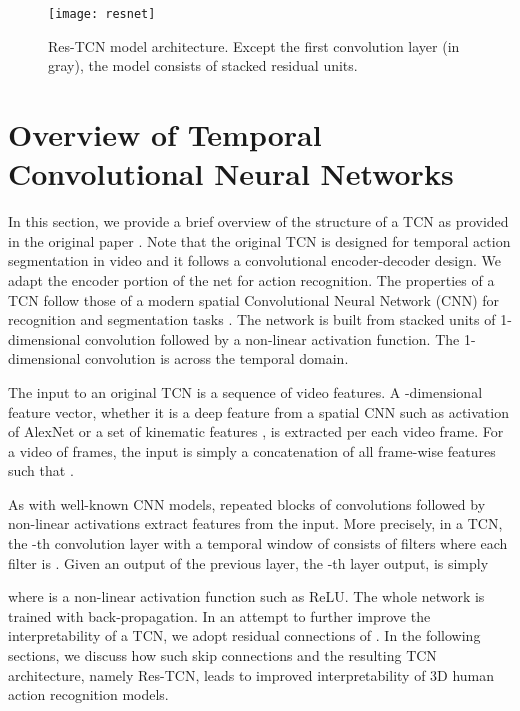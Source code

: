 \documentclass[10pt,twocolumn,letterpaper]{article}
\begin{document}
\begin{figure*}
\begin{center}
\texttt{[image: resnet]}
\end{center}
   \caption{Res-TCN model architecture. Except the first convolution layer (in gray), the model consists of stacked residual units.}
\label{fig:model}
\end{figure*}

\section{Overview of Temporal Convolutional Neural Networks}
In this section, we provide a brief overview of the structure of a TCN as provided in the original paper \cite{TCN}. Note that the original TCN is designed for temporal action segmentation in video and it follows a convolutional encoder-decoder design. We adapt the encoder portion of the net for action recognition. The properties of a TCN follow those of a modern spatial Convolutional Neural Network (CNN) for recognition \cite{lecun, alexnet, vgg} and segmentation tasks  \cite{segnet}. The network is built from stacked units of 1-dimensional convolution followed by a non-linear activation function. The 1-dimensional convolution is across the temporal domain.

The input to an original TCN is a sequence of video features. A -dimensional feature vector, whether it is a deep feature from a spatial CNN such as  activation of AlexNet \cite{alexnet} or a set of kinematic features \cite{TCN}, is extracted per each video frame. For a video of  frames, the input  is simply a concatenation of all frame-wise features such that . 

As with well-known CNN models, repeated blocks of convolutions followed by non-linear activations extract features from the input. More precisely, in a TCN, the -th convolution layer with a temporal window of  consists of  filters  where each filter is . Given an output  of the previous layer, the -th layer output,  is simply

where  is a non-linear activation function such as ReLU. The whole network is trained with back-propagation. In an attempt to further improve the interpretability of a TCN, we adopt residual connections of \cite{resnet}. In the following sections, we discuss how such skip connections and the resulting TCN architecture, namely Res-TCN, leads to improved interpretability of 3D human action recognition models. 
\end{document}
